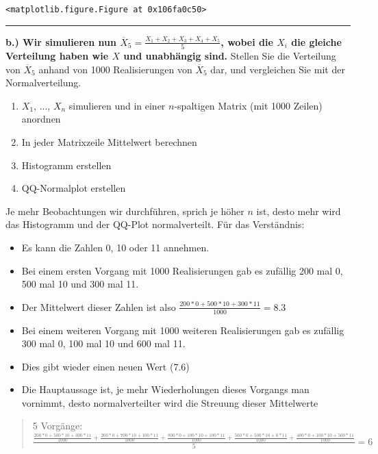\documentclass[11pt]{article}
\providecommand{\tightlist}{%
      \setlength{\itemsep}{0pt}\setlength{\parskip}{0pt}}
\begin{document}
    
    \begin{verbatim}
<matplotlib.figure.Figure at 0x106fa0c50>
    \end{verbatim}

    
    \begin{center}\rule{0.5\linewidth}{\linethickness}\end{center}

\textbf{b.) Wir simulieren nun
\(\overline{X}_5 = \frac{X_1+X_2+X_3+X_4+X_5}{5}\), wobei die \(X_i\)
die gleiche Verteilung haben wie \(X\) und unabhängig sind.} Stellen Sie
die Verteilung von \(\overline{X}_5\) anhand von 1000 Realisierungen von
\(\overline{X}_5\) dar, und vergleichen Sie mit der Normalverteilung.

\begin{enumerate}
\def\labelenumi{\arabic{enumi}.}
\tightlist
\item
  \(X_1\), ..., \(X_n\) simulieren und in einer \(n\)-spaltigen Matrix
  (mit 1000 Zeilen) anordnen
\item
  In jeder Matrixzeile Mittelwert berechnen
\item
  Histogramm erstellen
\item
  QQ-Normalplot erstellen
\end{enumerate}

Je mehr Beobachtungen wir durchführen, sprich je höher \(n\) ist, desto
mehr wird das Histogramm und der QQ-Plot normalverteilt. Für das
Verständnis:

\begin{itemize}
\tightlist
\item
  Es kann die Zahlen 0, 10 oder 11 annehmen.
\item
  Bei einem ersten Vorgang mit 1000 Realisierungen gab es zufällig 200
  mal 0, 500 mal 10 und 300 mal 11.
\item
  Der Mittelwert dieser Zahlen ist also
  \(\frac{200*0 + 500*10 + 300*11}{1000} = 8.3\)
\item
  Bei einem weiteren Vorgang mit 1000 weiteren Realisierungen gab es
  zufällig 300 mal 0, 100 mal 10 und 600 mal 11.
\item
  Dies gibt wieder einen neuen Wert (7.6)
\item
  Die Hauptaussage ist, je mehr Wiederholungen dieses Vorgangs man
  vornimmt, desto normalverteilter wird die Streuung dieser Mittelwerte
\end{itemize}

\begin{quote}
5 Vorgänge:
\(\frac{\frac{200*0+500*10+300*11}{1000}+\frac{200*0+700*10+100*11}{1000}+\frac{800*0+100*10+100*11}{1000}+\frac{500*0+500*10+0*11}{1000}+\frac{400*0+100*10+500*11}{1000}}{5} = 6\)
\end{quote}
\end{document}
